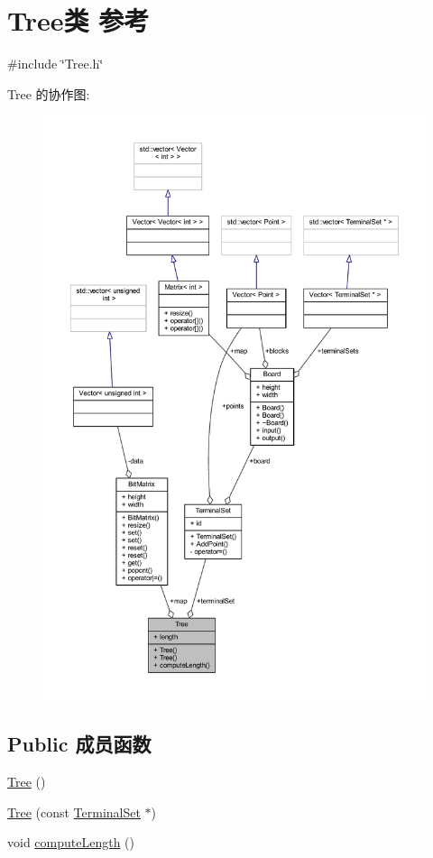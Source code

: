 \hypertarget{classTree}{}\section{Tree类 参考}
\label{classTree}


{\ttfamily \#include \char`\"{}Tree.\+h\char`\"{}}



Tree 的协作图\+:
\nopagebreak
\begin{figure}[H]
\begin{center}
\leavevmode
\includegraphics[width=350pt]{classTree__coll__graph}
\end{center}
\end{figure}
\subsection*{Public 成员函数}
\begin{DoxyCompactItemize}
\item 
\hyperlink{classTree_ad376a7c639d857312f5de2ef47482f68}{Tree} ()
\item 
\hyperlink{classTree_a7c8567f1cd838f15d83f312edcf571d3}{Tree} (const \hyperlink{classTerminalSet}{Terminal\+Set} $\ast$)
\item 
void \hyperlink{classTree_a70810e1d66ffb05f9787ab07c713c104}{compute\+Length} ()
\end{DoxyCompactItemize}
